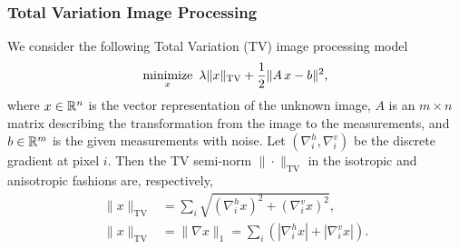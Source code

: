 \subsubsection{Total Variation Image Processing}
We consider the following Total Variation (TV) image processing model
\begin{equation}\label{eqn:tvl2}
\Min_{x}~\lambda \|x\|_{\text{TV}} + \frac{1}{2} \|A\,x - b\|^2,
\end{equation}
where $x\in \mathbb{R}^n$ is the vector representation of the unknown image, $A$ is an $m \times n$ matrix describing the transformation from the image to the measurements, and $b \in \mathbb{R}^m$ is the given measurements with noise. Let $(\nabla_i^h,\nabla_i^v)$ be the discrete gradient at pixel $i$. Then the TV semi-norm $\|\cdot\|_{\text{TV}}$ in the isotropic and anisotropic fashions are, respectively,
\begin{subequations}
\begin{align}
\|x\|_{\text{TV}} &= {\sum_{i} \sqrt{(\nabla_i^h x)^2 + (\nabla_i^v x)^2},}\\
  \| x\|_{\text{TV}} &= \| \nabla x\|_1 = \sum_{i} \left(|\nabla_i^h x| + |\nabla_i^v x|\right).
	\end{align}
\end{subequations}

%
%
%


